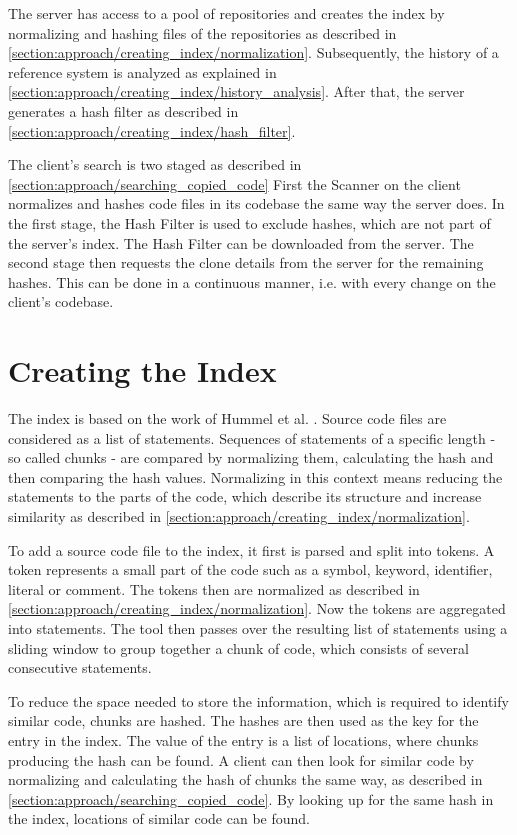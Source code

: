 The server has access to a pool of repositories and creates the index by normalizing and hashing files of the repositories as described in \autoref{section:approach/creating_index/normalization}.
Subsequently, the history of a reference system is analyzed as explained in \autoref{section:approach/creating_index/history_analysis}.
After that, the server generates a hash filter as described in \autoref{section:approach/creating_index/hash_filter}.

The client's search is two staged as described in \autoref{section:approach/searching_copied_code}
First the Scanner on the client normalizes and hashes code files in its codebase the same way the server does.
In the first stage, the Hash Filter is used to exclude hashes, which are not part of the server's index.
The Hash Filter can be downloaded from the server.
The second stage then requests the clone details from the server for the remaining hashes.
This can be done in a continuous manner, i.e. with every change on the client's codebase.

\section{Creating the Index}\label{section:approach/creating_index}
The index is based on the work of Hummel et al. \cite{hummel2010index}.
Source code files are considered as a list of statements.
Sequences of statements of a specific length - so called chunks - are compared by normalizing them, calculating the hash and then comparing the hash values.
Normalizing in this context means reducing the statements to the parts of the code, which describe its structure and increase similarity as described in \autoref{section:approach/creating_index/normalization}.

To add a source code file to the index, it first is parsed and split into tokens.
A token represents a small part of the code such as a symbol, keyword, identifier, literal or comment.
The tokens then are normalized as described in \autoref{section:approach/creating_index/normalization}.
Now the tokens are aggregated into statements.
The tool then passes over the resulting list of statements using a sliding window to group together a chunk of code, which consists of several consecutive statements.

To reduce the space needed to store the information, which is required to identify similar code, chunks are hashed.
The hashes are then used as the key for the entry in the index.
The value of the entry is a list of locations, where chunks producing the hash can be found.
A client can then look for similar code by normalizing and calculating the hash of chunks the same way, as described in \autoref{section:approach/searching_copied_code}.
By looking up for the same hash in the index, locations of similar code can be found.

